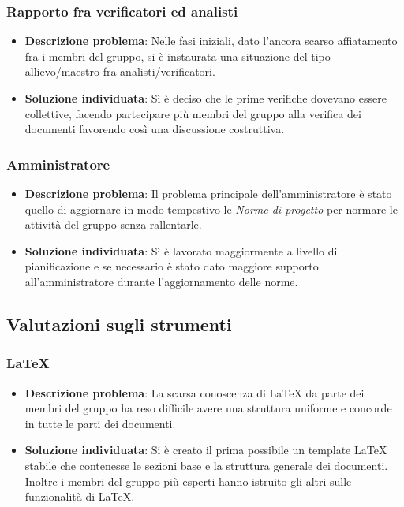 	\subsubsection{Rapporto fra verificatori ed analisti}
		\begin{itemize}
			\item \textbf{Descrizione problema}: Nelle fasi iniziali, dato l'ancora scarso affiatamento fra i membri del gruppo, si è instaurata una situazione del tipo allievo/maestro fra analisti/verificatori.
			\item \textbf{Soluzione individuata}: Sì è deciso che le prime verifiche dovevano essere collettive, facendo partecipare più membri del gruppo alla verifica dei documenti favorendo così una discussione costruttiva.
		\end{itemize}
	\subsubsection{Amministratore}
		\begin{itemize}
			\item \textbf{Descrizione problema}: Il problema principale dell'amministratore è stato quello di aggiornare in modo tempestivo le \textit{Norme di progetto} per normare le attività del gruppo senza rallentarle.
			\item \textbf{Soluzione individuata}: Sì è lavorato maggiormente a livello di pianificazione e se necessario è stato dato maggiore supporto all'amministratore durante l'aggiornamento delle norme.
		\end{itemize}
\subsection{Valutazioni sugli strumenti}
	\subsubsection{\LaTeX}
		\begin{itemize}
			\item \textbf{Descrizione problema}: La scarsa conoscenza di \LaTeX\xspace da parte dei membri del gruppo ha reso difficile avere una struttura uniforme e concorde in tutte le parti dei documenti.
			\item \textbf{Soluzione individuata}: Si è creato il prima possibile un template \LaTeX\xspace stabile che contenesse le sezioni base e la struttura generale dei documenti. Inoltre i membri del gruppo più esperti hanno istruito gli altri sulle funzionalità di \LaTeX.
		\end{itemize}

